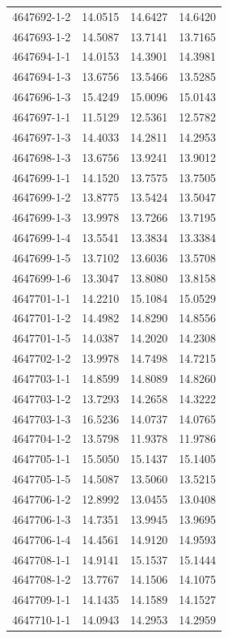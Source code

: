 \begin{longtable}{lrrr}
4647692-1-2 & 14.0515 & 14.6427 & 14.6420 \\
4647693-1-2 & 14.5087 & 13.7141 & 13.7165 \\
4647694-1-1 & 14.0153 & 14.3901 & 14.3981 \\
4647694-1-3 & 13.6756 & 13.5466 & 13.5285 \\
4647696-1-3 & 15.4249 & 15.0096 & 15.0143 \\
4647697-1-1 & 11.5129 & 12.5361 & 12.5782 \\
4647697-1-3 & 14.4033 & 14.2811 & 14.2953 \\
4647698-1-3 & 13.6756 & 13.9241 & 13.9012 \\
4647699-1-1 & 14.1520 & 13.7575 & 13.7505 \\
4647699-1-2 & 13.8775 & 13.5424 & 13.5047 \\
4647699-1-3 & 13.9978 & 13.7266 & 13.7195 \\
4647699-1-4 & 13.5541 & 13.3834 & 13.3384 \\
4647699-1-5 & 13.7102 & 13.6036 & 13.5708 \\
4647699-1-6 & 13.3047 & 13.8080 & 13.8158 \\
4647701-1-1 & 14.2210 & 15.1084 & 15.0529 \\
4647701-1-2 & 14.4982 & 14.8290 & 14.8556 \\
4647701-1-5 & 14.0387 & 14.2020 & 14.2308 \\
4647702-1-2 & 13.9978 & 14.7498 & 14.7215 \\
4647703-1-1 & 14.8599 & 14.8089 & 14.8260 \\
4647703-1-2 & 13.7293 & 14.2658 & 14.3222 \\
4647703-1-3 & 16.5236 & 14.0737 & 14.0765 \\
4647704-1-2 & 13.5798 & 11.9378 & 11.9786 \\
4647705-1-1 & 15.5050 & 15.1437 & 15.1405 \\
4647705-1-5 & 14.5087 & 13.5060 & 13.5215 \\
4647706-1-2 & 12.8992 & 13.0455 & 13.0408 \\
4647706-1-3 & 14.7351 & 13.9945 & 13.9695 \\
4647706-1-4 & 14.4561 & 14.9120 & 14.9593 \\
4647708-1-1 & 14.9141 & 15.1537 & 15.1444 \\
4647708-1-2 & 13.7767 & 14.1506 & 14.1075 \\
4647709-1-1 & 14.1435 & 14.1589 & 14.1527 \\
4647710-1-1 & 14.0943 & 14.2953 & 14.2959 \\

\end{longtable}
